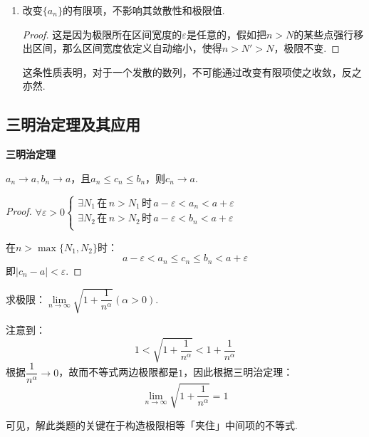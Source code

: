 \begin{enumerate}[property]
    \begin{question}
        求极限：$\lim\limits_{n \to \infty}\dfrac{2^n + 5 \cdot 3^n}{3^n + 5 \cdot 2^n}$.
    \end{question}
    \begin{solution}
        \[\lim\limits_{n \to \infty}\frac{2^n + 5 \cdot 3^n}{3^n + 5 \cdot 2^n} = \lim\limits_{n \to \infty}\frac{\left(\frac{2}{3}\right)^n + 5}{1 + 5 \cdot \left(\frac{2}{3}\right)^n} = 5\]
    \end{solution}

    \item 改变$\{a_n\}$的有限项，不影响其敛散性和极限值.
    \begin{proof}
        这是因为极限所在区间宽度的$\varepsilon$是任意的，假如把$n>N$的某些点强行移出区间，那么区间宽度依定义自动缩小，使得$n>N'>N$，极限不变.
    \end{proof}

    这条性质表明，对于一个发散的数列，不可能通过改变有限项使之收敛，反之亦然.
\end{enumerate}


\subsection{三明治定理及其应用}
\begin{theorem}
    \textbf{三明治定理}

    $a_n \to a, b_n \to a$，且$a_n \leqslant c_n \leqslant b_n$，则$c_n \to a$.
\end{theorem}
\begin{proof}
    $\forall \varepsilon > 0 \begin{cases}
        \exists N_1 \,\text{在}\, n>N_1 \,\text{时}\, a-\varepsilon < a_n < a+\varepsilon \\
        \exists N_2 \,\text{在}\, n>N_2 \,\text{时}\, a-\varepsilon < b_n < a+\varepsilon \\
    \end{cases}$

    在$n > \max\{N_1, N_2\}$时：
    \[a-\varepsilon < a_n \leqslant c_n \leqslant b_n < a+\varepsilon\]
    即$|c_n - a| < \varepsilon$.
\end{proof}

\begin{question}
    求极限：$\lim\limits_{n \to \infty}\sqrt{1+\dfrac{1}{n^\alpha}}(\alpha>0)$.
\end{question}
\begin{solution}
    注意到：
    \[1 < \sqrt{1+\dfrac{1}{n^\alpha}} < 1+\dfrac{1}{n^\alpha}\]
    根据$\dfrac{1}{n^\alpha} \to 0$，故而不等式两边极限都是$1$，因此根据三明治定理：
    \[\lim\limits_{n \to \infty}\sqrt{1+\dfrac{1}{n^\alpha}} = 1\]
\end{solution}
可见，解此类题的关键在于构造极限相等「夹住」中间项的不等式.

